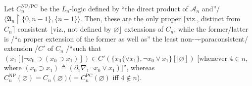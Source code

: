 \documentclass[bsl,meeting]{asl}
\newcommand{\mr}[1]{\mathrm{#1}}
\newcommand{\mf}[1]{\mathfrak{#1}}
\newcommand{\mc}[1]{\mathcal{#1}}
\newcommand{\couple}[2]{\langle{#1},{#2}\rangle}
\newcommand{\restr}{{\upharpoonright}}
\begin{document}
\begin{theorem}
\label{ext-thm}
Let\/ $C_n^\mr{NP/PC}$ be the $L_n$-logic defined by
``the direct product of $\mc{A}_n$ and''/
$\couple{\mf{A}_n\restr\{0,n-1\}}{\{n-1\}}$.
Then, these are the only proper\/ $\lceil$viz., distinct from\/ $C_n\rceil$
consistent\/ $\lfloor$viz., not defined by\/ $\varnothing\rfloor$ extensions of\/
$C_n$, while the former/latter is /``a proper extension of the former
as well as''
the least
non-$\neg$-paraconsistent/ extension /\/$C'$ of\/ $C_n$
/``such that $(x_1[|\neg x_0\supset(x_0\supset x_1)])\in C'(\{x_0\{\lor x_1\},\neg x_0\lor
x_1\}[|\varnothing])$ [whenever\/ $4\in n$,
where\/ $(x_0\supset x_1)\triangleq(\partial_1\nabla_1\neg x_0\lor
x_1)$]'', whereas\/
$C_n^\mr{NP}(\varnothing)=C_n(\varnothing)(=C_n^\mr{PC}(\varnothing)$ iff\/
$4\not\in n$).
\end{theorem}

\vspace*{-0.5\baselineskip}
\end{document}
